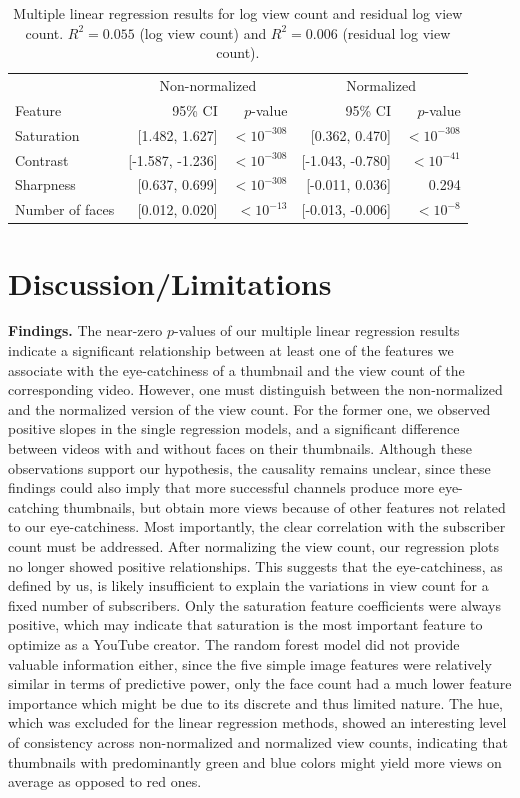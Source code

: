 \documentclass{article}
\begin{document}
\begin{table}[h]
\centering
\begin{tabular}{lrrrr}
\toprule
& \multicolumn{2}{c}{Non-normalized} & \multicolumn{2}{c}{Normalized} \\
\cmidrule(lr){2-3} \cmidrule(lr){4-5}
Feature & 95\% CI & $p$-value & 95\% CI & $p$-value \\
\midrule
Saturation & [1.482, 1.627] & $<10^{-308}$ & [0.362, 0.470] & $<10^{-308}$ \\

Contrast & [-1.587, -1.236] & $<10^{-308}$ & [-1.043, -0.780] & $<10^{-41}$ \\
Sharpness & [0.637, 0.699] & $<10^{-308}$ & [-0.011, 0.036] & 0.294 \\
Number of faces & [0.012, 0.020] & $<10^{-13}$ & [-0.013, -0.006] & $<10^{-8}$ \\
\bottomrule
\end{tabular}
\caption{Multiple linear regression results for log view count and residual log view count. $R^2 = 0.055$ (log view count) and $R^2 = 0.006$ (residual log view count).}
\label{tab:regression}
\end{table}


\section{Discussion/Limitations}
\textbf{Findings.} The near-zero $p$-values of our multiple linear regression results indicate a significant relationship between at least one of the features we associate with the eye-catchiness of a thumbnail and the view count of the corresponding video. However, one must distinguish between the non-normalized and the normalized version of the view count. For the former one, we observed positive slopes in the single regression models, and a significant difference between videos with and without faces on their thumbnails. Although these observations support our hypothesis, the causality remains unclear, since these findings could also imply that more successful channels produce more eye-catching thumbnails, but obtain more views because of other features not related to our eye-catchiness. Most importantly, the clear correlation with the subscriber count must be addressed. After normalizing the view count, our regression plots no longer showed positive relationships. This suggests that the eye-catchiness, as defined by us, is likely insufficient to explain the variations in view count for a fixed number of subscribers. Only the saturation feature coefficients were always positive, which may indicate that saturation is the most important feature to optimize as a YouTube creator. The random forest model did not provide valuable information either, since the five simple image features were relatively similar in terms of predictive power, only the face count had a much lower feature importance which might be due to its discrete and thus limited nature. The hue, which was excluded for the linear regression methods, showed an interesting level of consistency across non-normalized and normalized view counts, indicating that thumbnails with predominantly green and blue colors might yield more views on average as opposed to red ones.
\end{document}
